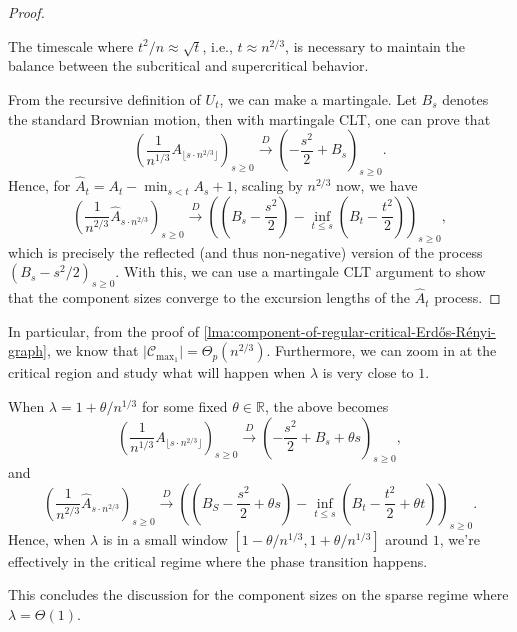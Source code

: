 \begin{proof}
	\begin{intuition}
		The timescale where \(t^2 / n \approx \sqrt{t} \), i.e., \(t \approx n^{2 / 3}\), is necessary to maintain the balance between the subcritical and supercritical behavior.
	\end{intuition}

	From the recursive definition of \(U_t\), we can make a martingale. Let \(B_s\) denotes the standard Brownian motion, then with martingale CLT, one can prove that
	\[
		\left( \frac{1}{n^{1 / 3}} A_{\lfloor s \cdot n^{2 / 3} \rfloor } \right) _{s \geq 0}
		\overset{D}{\to} \left( - \frac{s^2}{2} + B_s \right) _{s \geq 0}.
	\]
	Hence, for \(\hat{A} _t = A_t - \min _{s < t} A_s + 1\), scaling by \(n^{2 / 3}\) now, we have
	\[
		\left( \frac{1}{n^{2 / 3}} \hat{A} _{s \cdot n^{2 / 3}} \right) _{s \geq 0}
		\overset{D}{\to} \left( \left( B_s - \frac{s^2}{2} \right) - \inf _{t \leq s} \left( B_t - \frac{t^2}{2} \right)  \right)_{s \geq 0},
	\]
	which is precisely the reflected (and thus non-negative) version of the process \((B_s - s^2 / 2)_{s\geq 0}\). With this, we can use a martingale CLT argument to show that the component sizes converge to the excursion lengths of the \(\hat{A} _t\) process.
\end{proof}

In particular, from the proof of \autoref{lma:component-of-regular-critical-Erdős-Rényi-graph}, we know that \(\lvert \mathcal{C} _{\max _1} \rvert = \Theta _p(n^{2 / 3})\). Furthermore, we can zoom in at the critical region and study what will happen when \(\lambda \) is very close to \(1\).

\begin{remark}
	When \(\lambda = 1 + \theta / n^{1 / 3} \) for some fixed \(\theta \in \mathbb{R} \), the above becomes
	\[
		\left( \frac{1}{n^{1 / 3}} A_{\lfloor s \cdot n^{2 / 3} \rfloor } \right) _{s \geq 0}
		\overset{D}{\to} \left( - \frac{s^2}{2} + B_s + \theta s\right) _{s \geq 0},
	\]
	and
	\[
		\left( \frac{1}{n^{2 / 3}} \hat{A} _{s \cdot n^{2 / 3}} \right) _{s \geq 0}
		\overset{D}{\to} \left( \left( B_S - \frac{s^2}{2} + \theta s\right) - \inf _{t \leq s} \left( B_t - \frac{t^2}{2} + \theta t \right)  \right)_{s \geq 0}.
	\]
	Hence, when \(\lambda \) is in a small window \([1 - \theta / n^{1 / 3}, 1 + \theta / n^{1 / 3}]\) around \(1\), we're effectively in the critical regime where the phase transition happens.
\end{remark}

This concludes the discussion for the component sizes on the sparse regime where \(\lambda = \Theta (1)\).

